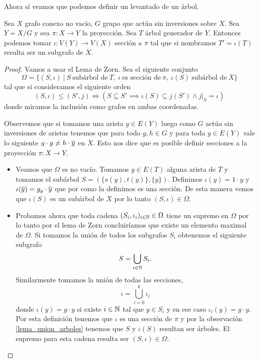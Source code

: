 \documentclass[tesis.tex]{subfiles}
\begin{document}
Ahora sí veamos que podemos definir un levantado de un árbol.

\begin{prop}\label{prop_levantado_accion_arbol}
	Sea $X$ grafo conexo no vacío, $G$ grupo que actúa sin inversiones sobre $X$.
	Sea $Y= X / G$ y sea $\pi:X \to Y$ la proyección. 
	Sea $T$ árbol generador de $Y$.
	Entonces podemos tomar $\iota:V(Y) \to V(X)$ sección a $\pi$ tal que si nombramos $T' = \iota(T)$ resulta ser un subgrafo de $X$.
\end{prop}

\begin{proof}
	Vamos a usar el Lema de Zorn.
	Sea el siguiente conjunto
	\[
		\Omega = \{ (S, \iota)	  \ | \   S \ \text{subárbol de} \ T, \ \iota \ \text{es sección de} \ \pi, \ \iota (S) \ \text{subárbol de} \ X  \}
	\]
	tal que si consideramos el siguiente orden
	\[
		(S,\iota) \le (S', j) \iff (S \subseteq S' \implies \iota(S) \subseteq j(S') \land \left. j \right|_{S} = \iota)
	\]
	donde miramos la inclusión como grafos en ambas coordenadas.
	
	Observemos que si tomamos una arista $y \in E(Y)$ luego como $G$ actúa sin inversiones de aristas tenemos que para todo $g,h \in G$ y para toda $y \in E(Y)$ vale lo siguiente $g \cdot y \neq h \cdot \overline{y}$ en $X$. 
	Esto nos dice que es posible definir secciones a la proyección $\pi:X \to Y$.
	
	\begin{itemize}
		\item Veamos que $\Omega$ es no vacío.
		Tomamos $y \in E(T)$ alguna arista de $T$ y tomamos el subárbol $S = (\{ s(y), t(y) \}, \{y\})$. 
		Definimos $\iota(y) = 1 \cdot y$ y $\iota(\overline y) = g_{y} \cdot \overline{y}$ que por como la definimos es una sección.
		De esta manera vemos que $\iota(S)$ es un subárbol de $X$ por lo tanto $(S, \iota) \in \Omega$.
		\item Probamos ahora que toda cadena $(S_i, \iota_i)_{i \in \mathbb{N}} \in \Omega$ tiene un supremo en $\Omega$ por lo tanto por el lema de Zorn concluiríamos que existe un elemento maximal de $\Omega$.
		Si tomamos la unión de todos los subgrafos $S_{i}$ obtenemos el siguiente subgrafo
		\begin{equation*}
			S = \bigcup_{i \in \mathbb{N}} S_{i}.
		\end{equation*}
		Similarmente tomamos la unión de todas las secciones,
		\[
		\iota = \bigcup_{i = 0}^{k} \iota_i
		\]
		donde $\iota(y) = g \cdot y$ si existe $i \in \mathbb{N}$ tal que $y \in S_{i}$ y en ese caso $\iota_{i}(y) = g\cdot y$.
		Por esta definición tenemos que $\iota$ es una sección de $\pi$ y por la observación \ref{lema_union_arboles} tenemos que $S$ y $\iota(S)$ resultan ser árboles.
		El supremo para esta cadena resulta ser $(S, \iota) \in \Omega$.
	\end{itemize}
	

\end{proof}
\end{document}
